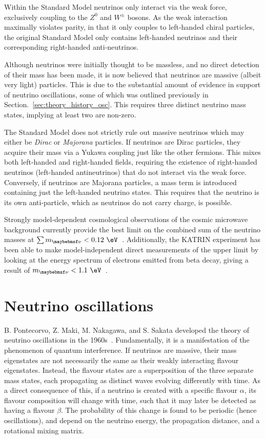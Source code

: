 Within the Standard Model neutrinos only interact via the weak force, exclusively coupling to the
$Z^{0}$ and $W^{\pm}$ bosons. As the weak interaction maximally violates parity, in that it only
couples to left-handed chiral particles, the original Standard Model only contains left-handed
neutrinos and their corresponding right-handed anti-neutrinos.

Although neutrinos were initially thought to be massless, and no direct detection of their mass
has been made, it is now believed that neutrinos are massive (albeit very light) particles. This
is due to the substantial amount of evidence in support of neutrino oscillations, some of which
was outlined previously in Section.~\ref{sec:theory_history_osc}. This requires three distinct
neutrino mass states, implying at least two are non-zero.

The Standard Model does not strictly rule out massive neutrinos which may either be \emph{Dirac}
or \emph{Majorana} particles. If neutrinos are Dirac particles, they acquire their mass via a
Yukawa coupling just like the other fermions. This mixes both left-handed and right-handed fields,
requiring the existence of right-handed neutrinos (left-handed antineutrinos) that do not interact
via the weak force. Conversely, if neutrinos are Majorana particles, a mass term is introduced
containing just the left-handed neutrino states. This requires that the neutrino is its own
anti-particle, which as neutrinos do not carry charge, is possible.

Strongly model-dependent cosmological observations of the cosmic microwave background currently
provide the best limit on the combined sum of the neutrino masses at $\sum m_{\nu} <
    0.12~\eV$~\cite{planck2018}. Additionally, the KATRIN experiment has been able to make
model-independent direct measurements of the upper limit by looking at the energy spectrum of
electrons emitted from beta decay, giving a result of $m_{\nu} < 1.1~\eV$~\cite{aker2019}.

\section{Neutrino oscillations} %
\label{sec:theory_oscillations} %

B. Pontecorvo, Z. Maki, M. Nakagawa, and S. Sakata developed the theory of neutrino oscillations
in the 1960s~\cite{maki1962, pontecorvo1967, pontecorvo1969}. Fundamentally, it is a manifestation
of the phenomenon of quantum interference. If neutrinos are massive, their mass eigenstates are
not necessarily the same as their weakly interacting flavour eigenstates. Instead, the flavour
states are a superposition of the three separate mass states, each propagating as distinct waves
evolving differently with time. As a direct consequence of this, if a neutrino is created with a
specific flavour $\alpha$, its flavour composition will change with time, such that it may later
be detected as having a flavour $\beta$. The probability of this change is found to be periodic
(hence oscillations), and depend on the neutrino energy, the propagation distance, and a
rotational mixing matrix.

